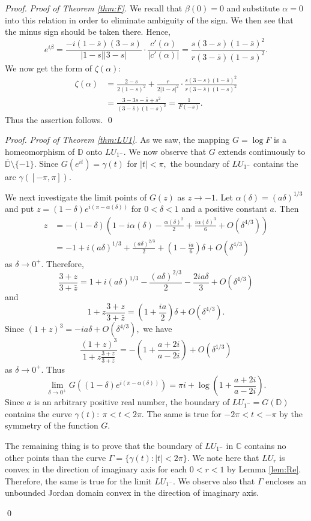 \documentclass[a4paper,12pt]{amsart}
\numberwithin{equation}{section}
\theoremstyle{definition}
\newenvironment{pf}[1][]{ \vskip 3mm
 \noindent
 \ifthenelse{\equal{#1}{}}  {{\slshape Proof. }}  {{\slshape #1.} } }{\qed\bigskip}
\begin{document}
\begin{pf}[Proof of Theorem \ref{thm:F}]
We recall that $\beta(0)=0$ and substitute $\alpha=0$
into this relation in order to eliminate ambiguity of the sign.
We then see that the minus sign should be taken there.
Hence,
$$
e^{i\beta}=\frac{-i(1-\bar s)(3-s)}{|1-s||3-s|}
\cdot\frac{c'(\alpha)}{|c'(\alpha)|}
=\frac{s(3-s)(1-\bar s)^2}{r(3-\bar s)(1-s)^2}.
$$
We now get the form of $\zeta(\alpha):$
\begin{align*}
\zeta(\alpha)&=\frac{2-s}{2(1-s)^2}+\frac{r}{2|1-s|^2}\cdot
\frac{s(3-s)(1-\bar s)^2}{r(3-\bar s)(1-s)^2} \\
&=\frac{3-3s-\bar s+s^2}{(3-\bar s)(1-s)^3}=\frac1{F(-s)}.
\end{align*}
Thus the assertion follows.
\end{pf}

\begin{pf}[Proof of Theorem \ref{thm:LU1}]
As we saw, the mapping $G=\log F$ is a homeomorphism of ${{\mathbb D}}$
onto $LU_{1^-}.$
We now observe that $G$ extends continuously to $\overline{{\mathbb D}}\setminus\{-1\}.$
Since $G(e^{it})=\gamma(t)$ for $|t|<\pi,$ the boundary of $LU_{1^-}$
contains the arc $\gamma([-\pi,\pi]).$

We next investigate the limit points of $G(z)$ as $z\to -1.$
Let $\alpha(\delta)=(a\delta)^{1/3}$ and put
$z=(1-\delta)e^{i(\pi-\alpha(\delta))}$ for $0<\delta<1$
and a positive constant $a.$
Then
\begin{align*}
z&=-(1-\delta)\left(1-i\alpha(\delta)-\frac{\alpha(\delta)^2}2
+\frac{i\alpha(\delta)^3}6+O(\delta^{4/3})\right)\\
&=-1+i(a\delta)^{1/3}+\frac{(a\delta)^{2/3}}2
+\left(1-\frac{ia}6\right)\delta+O(\delta^{4/3})
\end{align*}
as $\delta\to0^+.$
Therefore,
$$
\frac{3+z}{3+\bar z}
=1+i(a\delta)^{1/3}-\frac{(a\delta)^{2/3}}2-\frac{2ia\delta}3+O(\delta^{4/3})
$$
and
$$
1+z\frac{3+z}{3+\bar z}=\left(1+\frac{ia}2\right)\delta+O(\delta^{4/3}).
$$
Since $(1+z)^3=-ia\delta+O(\delta^{4/3}),$ we have
$$
\frac{(1+z)^3}{1+z\frac{3+z}{3+\bar z}}
=-\left(1+\frac{a+2i}{a-2i}\right)+O(\delta^{1/3})
$$
as $\delta\to0^+.$
Thus
$$
\lim_{\delta\to0^+}G((1-\delta)e^{i(\pi-\alpha(\delta))})
=\pi i+\log\left(1+\frac{a+2i}{a-2i}\right).
$$
Since $a$ is an arbitrary positive real number, the boundary of $LU_{1^-}=G({{\mathbb D}})$
contains the curve $\gamma(t):~\pi<t<2\pi.$
The same is true for $-2\pi<t<-\pi$ by the symmetry of the function $G.$

The remaining thing is to prove that the boundary of $LU_{1^-}$
in ${{\mathbb C}}$ contains no other points than the curve $\Gamma=\{\gamma(t):|t|<2\pi\}.$
We note here that $LU_r$ is convex in the direction of imaginary axis
for each $0<r<1$ by Lemma \ref{lem:Re}.
Therefore, the same is true for the limit $LU_{1^-}.$
We observe also that $\Gamma$ encloses an unbounded Jordan domain
convex in the direction of imaginary axis.


\end{pf}
\end{document}
